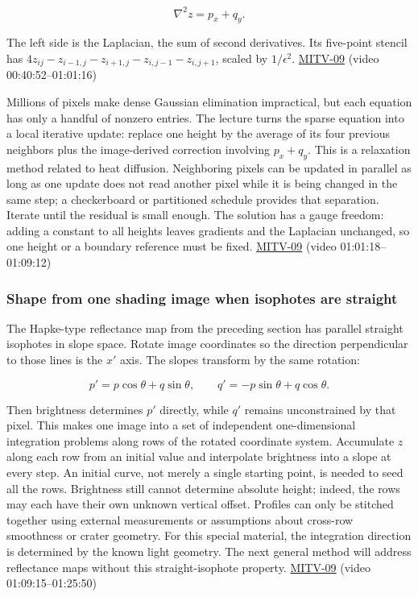 \[
\nabla^2 z=p_x+q_y.
\]

The left side is the Laplacian, the sum of second derivatives. Its five-point stencil has \(4z_{ij}-z_{i-1,j}-z_{i+1,j}-z_{i,j-1}-z_{i,j+1}\), scaled by \(1/\epsilon^2\). \hyperref[04-visual-computing-ii-ch036]{MITV-09} (video 00:40:52--01:01:16)

Millions of pixels make dense Gaussian elimination impractical, but each equation has only a handful of nonzero entries. The lecture turns the sparse equation into a local iterative update: replace one height by the average of its four previous neighbors plus the image-derived correction involving \(p_x+q_y\). This is a relaxation method related to heat diffusion. Neighboring pixels can be updated in parallel as long as one update does not read another pixel while it is being changed in the same step; a checkerboard or partitioned schedule provides that separation. Iterate until the residual is small enough. The solution has a gauge freedom: adding a constant to all heights leaves gradients and the Laplacian unchanged, so one height or a boundary reference must be fixed. \hyperref[04-visual-computing-ii-ch036]{MITV-09} (video 01:01:18--01:09:12)

\subsubsection{Shape from one shading image when isophotes are straight}\label{shape-from-one-shading-image-when-isophotes-are-straight}

The Hapke-type reflectance map from the preceding section has parallel straight isophotes in slope space. Rotate image coordinates so the direction perpendicular to those lines is the \(x'\) axis. The slopes transform by the same rotation:

\[
p'=p\cos\theta+q\sin\theta,\qquad q'=-p\sin\theta+q\cos\theta.
\]

Then brightness determines \(p'\) directly, while \(q'\) remains unconstrained by that pixel. This makes one image into a set of independent one-dimensional integration problems along rows of the rotated coordinate system. Accumulate \(z\) along each row from an initial value and interpolate brightness into a slope at every step. An initial curve, not merely a single starting point, is needed to seed all the rows. Brightness still cannot determine absolute height; indeed, the rows may each have their own unknown vertical offset. Profiles can only be stitched together using external measurements or assumptions about cross-row smoothness or crater geometry. For this special material, the integration direction is determined by the known light geometry. The next general method will address reflectance maps without this straight-isophote property. \hyperref[04-visual-computing-ii-ch036]{MITV-09} (video 01:09:15--01:25:50)

